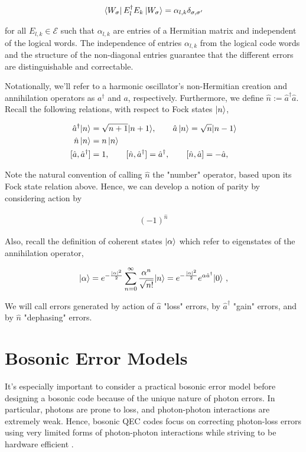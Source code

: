 \documentclass[12]{amsart}
\newcommand\0{\mathbf{0}}
\newcommand\<{\langle}
\renewcommand\>{\rangle}
\begin{document}
\begin{align}
\label{eq:k-l}
\bra{W_\sigma} E_l^\dag E_k \ket{W_\sigma} = \alpha_{l, k} \delta_{\sigma, \sigma'}	
\end{align}

for all $E_{l,k} \in \mathcal{E}$ such that $\alpha_{l,k}$ are entries of a Hermitian matrix and independent of the logical words. The independence of entries $\alpha_{l,k}$ from the logical code words and the structure of the non-diagonal entries guarantee that the different errors are distinguishable and correctable.

Notationally, we'll refer to a harmonic oscillator's non-Hermitian creation and annihilation operators as $a^\dag$ and $a$, respectively. Furthermore, we define $\hat{n} := \hat{a}^{\dag }\hat{a}$. Recall the following relations, with respect to Fock states $\ket{n}$,

\begin{align*}
\hat{a}^{\dagger }|n\rangle &={\sqrt {n+1}}|n+1\rangle, \qquad \hat{a}\ket{n}={\sqrt {n}}|n-1\rangle \\
\hat{n}\ket{n} &= n\ket{n} \\
[\hat{a}, \hat{a}^{\dag }]&=1, \qquad[\hat{n},\hat{a}^{\dag }]=\hat{a}^{\dag }, \qquad[\hat{n}, \hat{a}]=-\hat{a},
\end{align*}

Note the natural convention of calling $\hat{n}$ the "number" operator, based upon its Fock state relation above. Hence, we can develop a notion of parity by considering action by

\begin{align}
\label{eq:parity}
(-1)^{\hat{n}}	
\end{align}


Also, recall the definition of coherent states $\ket{\alpha}$ which refer to eigenstates of the annihilation operator,

$$
|\alpha\rangle =e^{-{|\alpha|^2\over2}}\sum_{n=0}^{\infty}{\alpha^n\over\sqrt{n!}}|n\rangle =e^{-{|\alpha|^2\over2}}e^{\alpha\hat a^\dagger}|0\rangle ~,
$$

We will call errors generated by action of $\hat{a}$ "loss" errors, by $\hat{a}^\dag$ "gain" errors, and by $\hat{n}$ "dephasing" errors. 

\section{Bosonic Error Models}

It's especially important to consider a practical bosonic error model before designing a bosonic code because of the unique nature of photon errors. In particular, photons are prone to loss, and photon-photon interactions are extremely weak. Hence, bosonic QEC codes focus on correcting photon-loss errors using very limited forms of photon-photon interactions while striving to be hardware efficient \cite{niu2018hardware}. 
\end{document}
